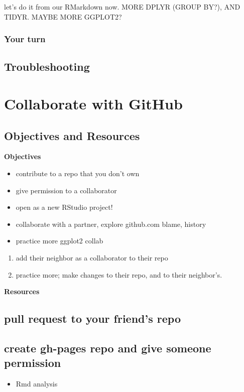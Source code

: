 \documentclass[]{book}
\providecommand{\tightlist}{%
  \setlength{\itemsep}{0pt}\setlength{\parskip}{0pt}}
\theoremstyle{definition}
\theoremstyle{definition}
\theoremstyle{definition}
\theoremstyle{remark}
\begin{document}
let's do it from our RMarkdown now. MORE DPLYR (GROUP BY?), AND TIDYR.
MAYBE MORE GGPLOT2?

\subsection{Your turn}\label{your-turn-13}

\section{Troubleshooting}\label{troubleshooting-4}

\chapter{Collaborate with GitHub}\label{collaborate}

\section{Objectives and Resources}\label{objectives-and-resources-1}

\textbf{Objectives}

\begin{itemize}
\tightlist
\item
  contribute to a repo that you don't own
\item
  give permission to a collaborator
\item
  open as a new RStudio project!
\item
  collaborate with a partner, explore github.com blame, history
\item
  practice more ggplot2 collab
\end{itemize}

\begin{enumerate}
\def\labelenumi{\arabic{enumi}.}
\tightlist
\item
  add their neighbor as a collaborator to their repo
\item
  practice more; make changes to their repo, and to their neighbor's.
\end{enumerate}

\textbf{Resources}

\section{pull request to your friend's
repo}\label{pull-request-to-your-friends-repo}

\section{create gh-pages repo and give someone
permission}\label{create-gh-pages-repo-and-give-someone-permission}

\begin{itemize}
\tightlist
\item
  Rmd analysis
\end{itemize}
\end{document}
